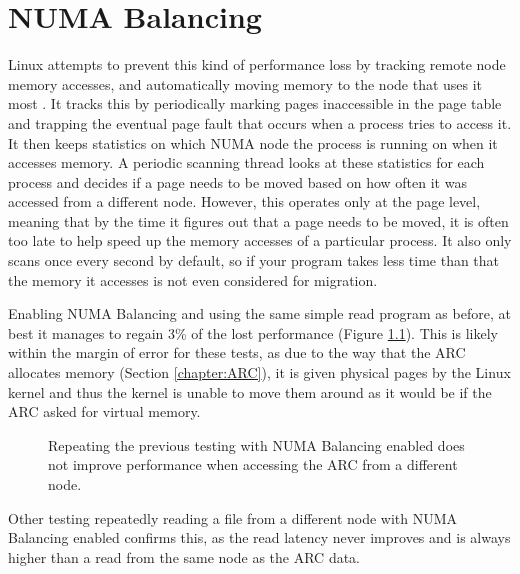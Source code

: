 \chapter{NUMA Balancing}
Linux attempts to prevent this kind of performance loss by tracking remote node memory accesses, and automatically moving memory to the node
that uses it most \cite[{Documentation/sysctl/kernel.txt}]{linux}.
It tracks this by periodically marking pages inaccessible in the page table and trapping the eventual page fault that occurs when 
a process tries to access it.
It then keeps statistics on which NUMA node the process is running on  when it accesses memory.
A periodic scanning thread looks at these statistics for each process and decides if a page needs to be moved
based on how often it was accessed from a different node.
However, this operates only at the page level, meaning that by the time it figures out that a page needs to be moved,
it is often too late to help speed up the memory accesses of a particular process.
It also only scans once every second by default, so if your program takes less time than that the memory it accesses
is not even considered for migration\cite[{kernel/sched/fair.c}]{linux}.

Enabling NUMA Balancing and using the same simple read program as before, at best it manages to regain
3\% of the lost performance (Figure \ref{fig:NUMABalance}).
This is likely within the margin of error for these tests, as due to the way that the ARC allocates memory (Section \ref{chapter:ARC}),
it is given physical pages by the Linux kernel and thus the kernel is unable to move them around as it would be if the ARC
asked for virtual memory.

\begin{figure}[H]
    \centering
    \resizebox{0.75\linewidth}{!}{}
    \captionsetup{width=0.75\linewidth}
    \caption{Repeating the previous testing with NUMA Balancing enabled does not improve performance when accessing the ARC from a different node.}
    \label{fig:NUMABalance}
\end{figure}

Other testing repeatedly reading a file from a different node with NUMA Balancing enabled confirms this,
as the read latency never improves and is always higher than a read from the same node as the ARC data.

